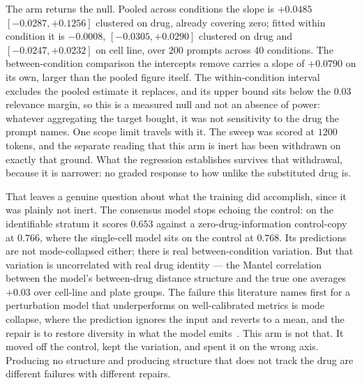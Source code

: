 The arm returns the null. Pooled across conditions the slope is $+0.0485$
$[-0.0287, +0.1256]$ clustered on drug, already covering zero; fitted within
condition it is $-0.0008$, $[-0.0305, +0.0290]$ clustered on drug and
$[-0.0247, +0.0232]$ on cell line, over $200$ prompts across $40$ conditions.
The between-condition comparison the intercepts remove carries a slope of $+0.0790$ on its own, larger than the pooled figure itself. The within-condition interval excludes the pooled estimate it replaces, and its upper bound sits below the $0.03$ relevance margin, so this is a measured null and not an absence of power: whatever aggregating the target bought, it was
not sensitivity to the drug the prompt names. One scope limit travels with it.
The sweep was scored at $1200$ tokens, and the separate reading that this arm is
inert has been withdrawn on exactly that ground.
What the regression establishes survives that withdrawal, because it is narrower:
no graded response to how unlike the substituted drug is.

That leaves a genuine question about what the training did accomplish, since it
was plainly not inert. The consensus model stops echoing the control: on the
identifiable stratum it scores $0.653$ against a zero-drug-information
control-copy at $0.766$, where the single-cell model sits on the control at
$0.768$. Its predictions are not mode-collapsed either; there is real
between-condition variation. But that variation is uncorrelated with real drug
identity --- the Mantel correlation between the model's between-drug distance
structure and the true one averages $+0.03$ over cell-line and plate groups. The
failure this literature names first for a perturbation model that underperforms
on well-calibrated metrics is mode collapse, where the prediction ignores the
input and reverts to a mean, and the repair is to restore diversity in what the
model emits~\cite{mejia}. This arm is not that. It moved off the control, kept
the variation, and spent it on the wrong axis. Producing no structure and
producing structure that does not track the drug are different failures with
different repairs.